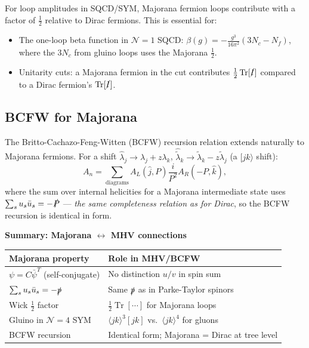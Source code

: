 \documentclass[12pt]{article}
\DeclareMathOperator\Tr{Tr}
\begin{document}
For loop amplitudes in SQCD/SYM, Majorana fermion loops contribute with a factor of
$\tfrac{1}{2}$ relative to Dirac fermions.  This is essential for:
\begin{itemize}
  \item The one-loop beta function in $\mathcal{N}=1$ SQCD:
        $\beta(g) = -\frac{g^3}{16\pi^2}(3N_c - N_f)$, where the $3N_c$ from gluino
        loops uses the Majorana $\tfrac{1}{2}$.
  \item Unitarity cuts: a Majorana fermion in the cut contributes $\tfrac{1}{2}\Tr[\slashed{l}]$
        compared to a Dirac fermion's $\Tr[\slashed{l}]$.
\end{itemize}

\subsection{BCFW for Majorana}

The Britto-Cachazo-Feng-Witten (BCFW) recursion relation extends naturally to Majorana
fermions.  For a shift $\hat\lambda_j \to \lambda_j + z\lambda_k$,
$\hat{\tilde\lambda}_k \to \tilde\lambda_k - z\tilde\lambda_j$ (a $[jk\rangle$ shift):
\begin{equation}
  A_n = \sum_{\text{diagrams}} A_L(\hat j, P) \frac{i}{P^2} A_R(-P, \hat k),
\end{equation}
where the sum over internal helicities for a Majorana intermediate state
uses $\sum_s u_s\bar u_s = -\slashed{P}$ — \emph{the same completeness relation
as for Dirac}, so the BCFW recursion is identical in form.

\begin{mdframed}[backgroundcolor=blue!5]
\textbf{Summary: Majorana $\leftrightarrow$ MHV connections}
\begin{center}
\begin{tabular}{ll}
\toprule
Majorana property & Role in MHV/BCFW \\
\midrule
$\psi = C\bar\psi^T$ (self-conjugate) & No distinction $u/v$ in spin sum \\
$\sum_s u_s\bar u_s = -\slashed{p}$ & Same $\slashed{p}$ as in Parke-Taylor spinors \\
Wick $\tfrac{1}{2}$ factor & $\tfrac{1}{2}\Tr[\cdots]$ for Majorana loops \\
Gluino in $\mathcal{N}=4$ SYM & $\langle jk\rangle^3[jk]$ vs.\ $\langle jk\rangle^4$ for gluons \\
BCFW recursion & Identical form; Majorana = Dirac at tree level \\
\bottomrule
\end{tabular}
\end{center}
\end{mdframed}

\vfill

\end{document}

